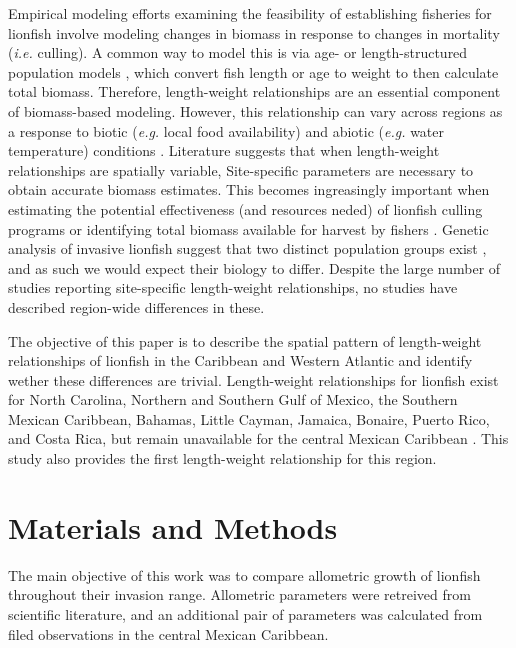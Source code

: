 \documentclass[fleqn,10pt,lineno]{wlpeerj} %
\begin{document}
Empirical modeling efforts examining the feasibility of establishing
fisheries for lionfish involve modeling changes in biomass in response
to changes in mortality (\emph{i.e.} culling). A common way to model
this is via age- or length-structured population models
\citep{cote_2014,barbour_2011,andradibrown_2017}, which convert fish
length or age to weight to then calculate total biomass. Therefore,
length-weight relationships are an essential component of biomass-based
modeling. However, this relationship can vary across regions as a
response to biotic (\emph{e.g.} local food availability) and abiotic
(\emph{e.g.} water temperature) conditions \citep{johnson_2016}.
Literature suggests that when length-weight relationships are spatially
variable, Site-specific parameters are necessary to obtain accurate
biomass estimates. This becomes ingreasingly important when estimating
the potential effectiveness (and resources neded) of lionfish culling
programs or identifying total biomass available for harvest by fishers
\citep{barbour_2011,morris_2011,johnston_2015,chin_2016,cote_2014}.
Genetic analysis of invasive lionfish suggest that two distinct
population groups exist \citep{betancurr_2011}, and as such we would
expect their biology to differ. Despite the large number of studies
reporting site-specific length-weight relationships, no studies have
described region-wide differences in these.

The objective of this paper is to describe the spatial pattern of
length-weight relationships of lionfish in the Caribbean and Western
Atlantic and identify wether these differences are trivial.
Length-weight relationships for lionfish exist for North Carolina,
Northern and Southern Gulf of Mexico, the Southern Mexican Caribbean,
Bahamas, Little Cayman, Jamaica, Bonaire, Puerto Rico, and Costa Rica,
but remain unavailable for the central Mexican Caribbean
\citep{barbour_2011,fogg_2013,dahl_2014,aguilarperera_2016,sabidoitza_2016,sabidoitz_2016,darling_2011,edwards_2014,chin_2016,deleon_2013,toledohernndez_2014,sandel_2015}.
This study also provides the first length-weight relationship for this
region.

\clearpage

\section*{Materials and Methods}

The main objective of this work was to compare allometric growth of
lionfish throughout their invasion range. Allometric parameters were
retreived from scientific literature, and an additional pair of
parameters was calculated from filed observations in the central Mexican
Caribbean.
\end{document}
